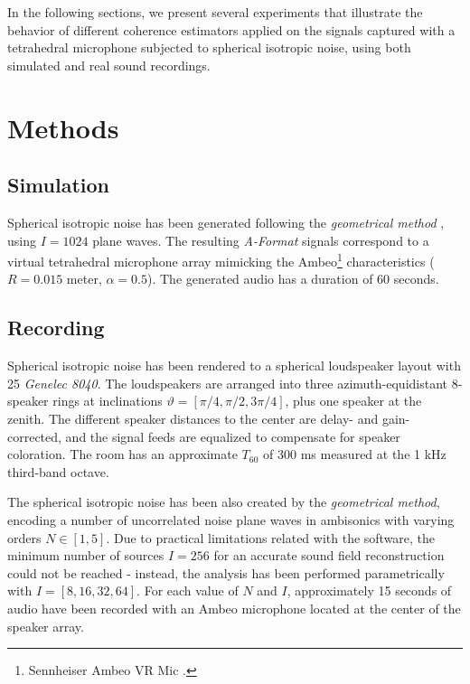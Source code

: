 In the following sections, we present several experiments that illustrate the behavior of different coherence estimators applied on the signals captured with a tetrahedral microphone subjected to spherical isotropic noise, using both simulated and real sound recordings.



\section{Methods}

\subsection{Simulation}
Spherical isotropic noise has been generated following the \textit{geometrical method} \cite{habets_generating_2007, habets_comments_2010}, using $I = 1024$ plane waves. The resulting \textit{A-Format} signals correspond to a virtual tetrahedral microphone array mimicking the Ambeo\footnote{Sennheiser Ambeo VR Mic \cite{sennheiser}.}
characteristics ($R=0.015$ meter, $\alpha=0.5$). 
The generated audio has a duration of 60 seconds. 





\subsection{Recording}

Spherical isotropic noise has been rendered to a spherical loudspeaker layout with 25 \textit{Genelec 8040}. The loudspeakers are arranged into three azimuth-equidistant 8-speaker rings at inclinations $\vartheta = [\pi/4, \pi/2, 3\pi/4]$, plus one speaker at the zenith.
The different speaker distances to the center are delay- and gain-corrected, and the signal feeds are equalized to compensate for speaker coloration. The room has an approximate $T_{60}$ of 300 ms measured at the 1 kHz third-band octave. 

The spherical isotropic noise has been also created by the \textit{geometrical method}, encoding a number of uncorrelated noise plane waves in ambisonics with varying orders $N \in [1,5]$. Due to practical limitations related with the software, the minimum number of sources $I = 256$ for an accurate sound field reconstruction \cite{habets_comments_2010} could not be reached - instead, the analysis has been performed parametrically with $I = [8, 16, 32, 64]$.
For each value of $N$ and $I$, approximately 15 seconds of audio have been recorded with an Ambeo microphone located at the center of the speaker array.

